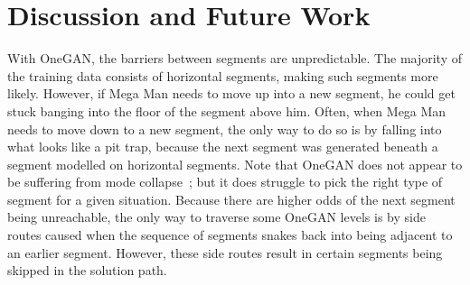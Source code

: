 


\section{Discussion and Future Work}


With OneGAN, the barriers between segments are unpredictable. The majority of the training data consists of horizontal segments, making such segments more likely. However, if Mega Man needs to move up into a new segment, he could get stuck banging into the floor of the segment above him. Often, when Mega Man needs to move down to a new segment, the only way to do so is by falling into what looks like a pit trap, because the next segment was generated beneath a segment modelled on horizontal segments. Note that OneGAN does not appear to be suffering from mode collapse~\cite{thanhtung2020catastrophic}; but it does struggle to pick the right type of segment for a given situation. Because there are higher odds of the next segment being unreachable, the only way to traverse some OneGAN levels is by side routes caused when the sequence of segments snakes back into being adjacent to an earlier segment. However, these side routes result in certain segments being skipped in the solution path.


